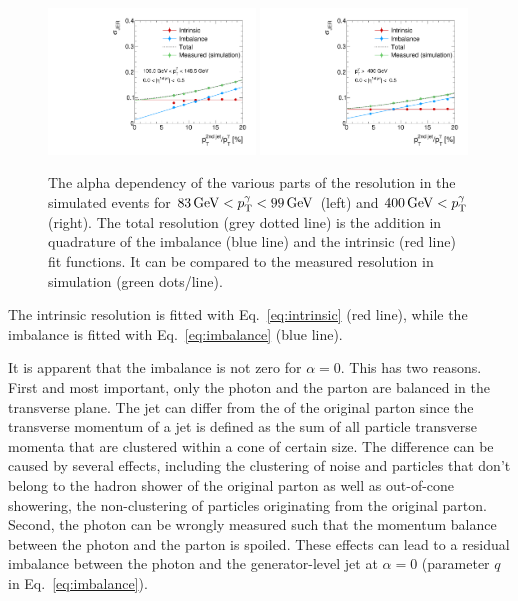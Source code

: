 \begin{figure}[!b]
 \centering
    \includegraphics[width=0.49\textwidth]{figures/resolution/methodology/JER_for_1_eta_bin_5_pTGamma_bin_wo_data_PFCHS_RMS99_mc.pdf} 
    \includegraphics[width=0.49\textwidth]{figures/resolution/methodology/JER_for_1_eta_bin_12_pTGamma_bin_wo_data_PFCHS_RMS99_mc.pdf} 
  \caption{The alpha dependency of the various parts of the resolution in the simulated events for $83 \,\text{Ge}\kern-0.06667em\text{V} < p_{\text{T}}^{\gamma} < 99 \,\text{Ge}\kern-0.06667em\text{V} $ (left) and $400 \,\text{Ge}\kern-0.06667em\text{V} < p_{\text{T}}^{\gamma}$ (right). 
           The total resolution (grey dotted line) is the addition in quadrature of the imbalance (blue line) and the intrinsic (red line) fit functions. 
           It can be compared to the measured resolution in simulation (green dots/line).}  
 \label{fig:AlphaDependenceOfResolutions}
\end{figure}
The intrinsic resolution is fitted with Eq.~\eqref{eq:intrinsic} (red line), while the imbalance is fitted with Eq.~\eqref{eq:imbalance} (blue line).

It is apparent that the imbalance is not zero for $\alpha=0$. 
This has two reasons.
First and most important, only the photon and the parton are balanced in the transverse plane.
The jet \pt can differ from the \pt of the original parton since the transverse momentum of a jet is defined as the sum of all particle transverse momenta that are clustered within a cone of certain size.
The difference can be caused by several effects, including the clustering of noise and particles that don't belong to the hadron shower of the original parton as well as out-of-cone showering, \ie the non-clustering of particles originating from the original parton.
Second, the photon \pt can be wrongly measured such that the momentum balance between the photon and the parton is spoiled. 
These effects can lead to a residual imbalance between the photon \pt and the generator-level jet \pt at $\alpha=0$ (parameter $q$ in Eq.~\eqref{eq:imbalance}).

